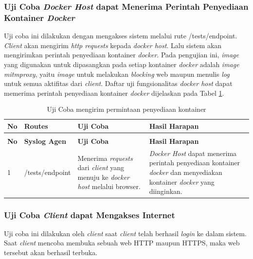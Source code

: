 \subsubsection{Uji Coba \textit{Docker Host} dapat Menerima Perintah Penyediaan Kontainer \textit{Docker}}
Uji coba ini dilakukan dengan mengakses sistem melalui rute /tests/endpoint. \textit{Client} akan mengirim \textit{http requests} kepada \textit{docker host}. Lalu sistem akan mengirimkan perintah penyediaan kontainer \textit{docker}. Pada pengujian ini, \textit{image} yang digunakan untuk dipasangkan pada setiap kontainer \textit{docker} adalah \textit{image mitmproxy}, yaitu \textit{image} untuk melakukan \textit{blocking} web maupun menulis \textit{log} untuk semua aktifitas dari \textit{client}. Daftar uji fungsionalitas \textit{docker host} dapat memerima perintah penyediaan kontainer \textit{docker} dijelaskan pada Tabel \ref{ujicoba3}.

\begin{longtable}{|p{}|p{}|p{}|p{}|} %
	
\caption{Skenario Uji Coba \textit{Docker Host} dapat Menerima Perintah Penyediaan Kontainer \textit{Docker}} \label{ujicoba3} \\
\hline
\textbf{No} & \textbf{Routes} & \textbf{Uji Coba} & \textbf{Hasil Harapan} \\ \hline
\endfirsthead
\caption[]{Uji Coba mengirim permintaan penyediaan kontainer}  \\
\hline
\textbf{No} & \textbf{Syslog Agen} & \textbf{Uji Coba} & \textbf{Hasil Harapan} \\ \hline
\endhead
\endfoot
\endlastfoot
1 & /tests/endpoint & Menerima \textit{requests} dari \textit{client} yang menuju ke \textit{docker host} melalui browser. & \textit{Docker Host} dapat menerima perintah penyediaan kontainer \textit{docker} dan menyediakan kontainer \textit{docker} yang diinginkan. \\ \hline
\end{longtable}

\subsubsection{Uji Coba \textit{Client} dapat Mengakses Internet}
Uji coba ini dilakukan oleh \textit{client} saat \textit{client} telah berhasil \textit{login} ke dalam sistem. Saat \textit{client} mencoba membuka sebuah web HTTP maupun HTTPS, maka web tersebut akan berhasil terbuka.


